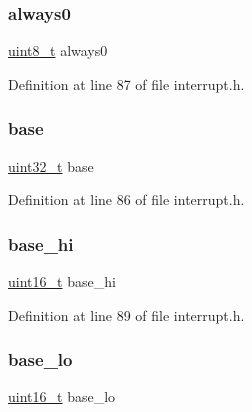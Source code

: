 \subsubsection{\texorpdfstring{always0}{always0}}
{\footnotesize\ttfamily \hyperlink{a00116_aba7bc1797add20fe3efdf37ced1182c5_aba7bc1797add20fe3efdf37ced1182c5}{uint8\+\_\+t} always0}



Definition at line 87 of file interrupt.\+h.

\mbox{\label{a00089_a0523cedff47e2441fc198b7770ec5d3f_a0523cedff47e2441fc198b7770ec5d3f}} 
\subsubsection{\texorpdfstring{base}{base}}
{\footnotesize\ttfamily \hyperlink{a00116_a435d1572bf3f880d55459d9805097f62_a435d1572bf3f880d55459d9805097f62}{uint32\+\_\+t} base}



Definition at line 86 of file interrupt.\+h.

\mbox{\label{a00089_af85e6d5e4292b0c25c18f701e61d51fa_af85e6d5e4292b0c25c18f701e61d51fa}} 
\subsubsection{\texorpdfstring{base\+\_\+hi}{base\_hi}}
{\footnotesize\ttfamily \hyperlink{a00116_a273cf69d639a59973b6019625df33e30_a273cf69d639a59973b6019625df33e30}{uint16\+\_\+t} base\+\_\+hi}



Definition at line 89 of file interrupt.\+h.

\mbox{\label{a00089_a1a4688f97e405d4c0700427f4b74a355_a1a4688f97e405d4c0700427f4b74a355}} 
\subsubsection{\texorpdfstring{base\+\_\+lo}{base\_lo}}
{\footnotesize\ttfamily \hyperlink{a00116_a273cf69d639a59973b6019625df33e30_a273cf69d639a59973b6019625df33e30}{uint16\+\_\+t} base\+\_\+lo}



